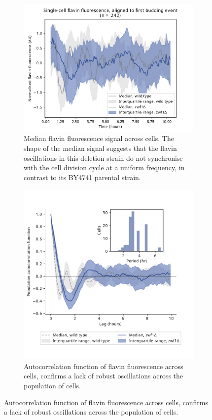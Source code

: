 \begin{figure}
  \centering
  \begin{subfigure}[t]{0.4\textwidth}
   \centering
   \includegraphics[width=\textwidth]{zwf1egf_409_6.pdf}
   \caption{
     Median flavin fluorescence signal across cells.%
     The shape of the median signal suggests that the flavin oscillations in this deletion strain do not synchronise with the cell division cycle at a uniform frequency, in contrast to its BY4741 parental strain.
   }
   \label{fig:biology-zwf1-median}
  \end{subfigure}%
  \begin{subfigure}[t]{0.4\textwidth}
   \centering
   \includegraphics[width=\textwidth]{zwf1egf_409_12.pdf}
   \caption{
    Autocorrelation function of flavin fluorescence across cells, confirms a lack of robust oscillations across the population of cells.
   }
   \label{fig:biology-zwf1-median}
  \end{subfigure}


\end{figure}
